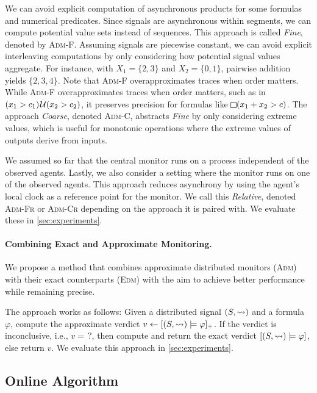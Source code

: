 We can avoid explicit computation of asynchronous products for some formulas and numerical predicates.
Since signals are asynchronous within segments, we can compute potential value sets instead of sequences.
This approach is called \emph{Fine}, denoted by \textsc{Adm-F}.
Assuming signals are piecewise constant, we can avoid explicit interleaving computations by only considering how potential signal values aggregate.
For instance, with $X_1 = \{2,3\}$ and $X_2 = \{0,1\}$, pairwise addition yields $\{2, 3, 4\}$.
Note that \textsc{Adm-F} overapproximates traces when order matters.
While \textsc{Adm-F} overapproximates traces when order matters, such as in $(x_1 > c_1) \kern.1em\mathcal{U} (x_2 > c_2)$, it preserves precision for formulas like $\LTLalways(x_1 + x_2 > c)$.
The approach \emph{Coarse}, denoted \textsc{Adm-C}, abstracts \emph{Fine} by only considering extreme values, which is useful for monotonic operations where the extreme values of outputs derive from inputs.

We assumed so far that the central monitor runs on a process independent of the observed agents.
Lastly, we also consider a setting where the monitor runs on one of the observed agents.
This approach reduces asynchrony by using the agent's local clock as a reference point for the monitor.
We call this \emph{Relative}, denoted \textsc{Adm-Fr} or \textsc{Adm-Cr} depending on the approach it is paired with.
We evaluate these in \cref{sec:experiments}.

\paragraph*{Combining Exact and Approximate Monitoring.}
We propose a method that combines approximate distributed monitors (\textsc{Adm}) with their exact counterparts (\textsc{Edm}) with the aim to achieve better performance while remaining precise.

The approach works as follows:
Given a distributed signal $(S,{\rightsquigarrow})$ and a formula $\varphi$, compute the approximate verdict $v \gets [(S,{\rightsquigarrow}) \models \varphi]_+$.
If the verdict is inconclusive, i.e., $v = {\,?}$, then compute and return the exact verdict $[(S,{\rightsquigarrow}) \models \varphi]$, else return $v$.
We evaluate this approach in \cref{sec:experiments}.

\bgroup \color{red}
\subsection{Online Algorithm} \label{sec:online}

